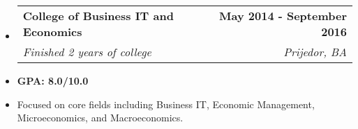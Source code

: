 \documentclass[letterpaper,11pt]{article}
\makeatletter
\newcommand{\resumeItem}[1]{
  \item\small{
    {#1 \vspace{0pt}}
  }
}
\newcommand{\resumeSubheading}[4]{
  \vspace{-2pt}\item
    \begin{tabular*}{1.0\textwidth}[t]{l@{\extracolsep{\fill}}r}
      \textbf{#1} & \textbf{\small #2} \\
      \textit{\small#3} & \textit{\small #4} \\
    \end{tabular*}\vspace{-7pt}
}
\newcommand{\resumeSubHeadingListStart}{\begin{itemize}[leftmargin=0.0in, label={}]}
\newcommand{\resumeSubHeadingListEnd}{\end{itemize}}\vspace{0pt}
\newcommand{\resumeItemListStart}{\begin{itemize}}
\newcommand{\resumeItemListEnd}{\end{itemize}\vspace{-5pt}}
\makeatother
\begin{document}
  \resumeSubHeadingListStart
    \resumeSubheading
      {College of Business IT and Economics}{May 2014 - September 2016}
      {Finished 2 years of college
      }{Prijedor, BA}
  \resumeSubHeadingListEnd
    \resumeItemListStart
        \resumeItem { \textbf{GPA: 8.0/10.0}}
        \vspace{-7pt}
        \resumeItem {Focused on core fields including Business IT, Economic Management, Microeconomics, and Macroeconomics.}
    \resumeItemListEnd
    \vspace{-12pt}
 \vspace{-16pt}
 \vspace{3pt}
\vspace{10pt}

\vspace{-15pt}
\end{document}
